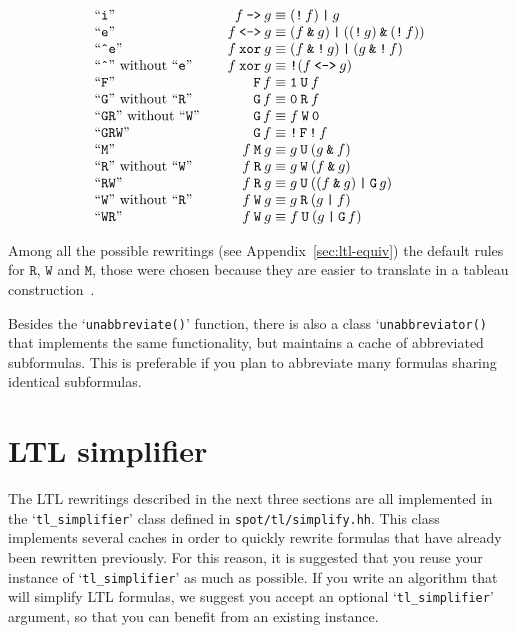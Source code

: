 \documentclass[a4paper,twoside,10pt,DIV=12]{scrreprt}
\DeclareMathOperator{\F}{\texttt{F}}
\DeclareMathOperator{\G}{\texttt{G}}
\newcommand{\U}{\mathbin{\texttt{U}}}
\newcommand{\R}{\mathbin{\texttt{R}}}
\newcommand{\M}{\mathbin{\texttt{M}}}
\newcommand{\W}{\mathbin{\texttt{W}}}
\DeclareMathOperator{\NOT}{\texttt{!}}
\newcommand{\XOR}{\mathbin{\texttt{xor}}}
\newcommand{\IMPLIES}{\mathbin{\texttt{->}}}
\newcommand{\EQUIV}{\mathbin{\texttt{<->}}}
\newcommand{\OR}{\mathbin{\texttt{|}}}
\newcommand{\AND}{\mathbin{\texttt{\&}}}
\newcommand{\0}{\texttt{0}}
\newcommand{\1}{\texttt{1}}
\begin{document}
\[
\begin{array}{l@{\qquad}r@{\;}c@{\;}l}
``\texttt{i}" & f\IMPLIES g &\equiv&  (\NOT f)\OR g\\
``\texttt{e}" & f\EQUIV g &\equiv&  (f\AND g)\OR ((\NOT g)\AND(\NOT f))\\
``\texttt{\^{}e}" & f\XOR g &\equiv&  (f\AND\NOT g)\OR (g\AND\NOT f)\\
``\texttt{\^{}}"\text{~without~}``\texttt{e}" & f\XOR g &\equiv&  \NOT(f\EQUIV g)\\
``\texttt{F}" & \F f&\equiv& \1\U f\\
``\texttt{G}"\text{~without~}``\texttt{R}" & \G f&\equiv& \0\R f \\
``\texttt{GR}"\text{~without~}``\texttt{W}" & \G f&\equiv& f \W \0 \\
``\texttt{GRW}" & \G f&\equiv& \NOT\F\NOT f \\
``\texttt{M}" & f \M g&\equiv& g \U (g \AND f) \\
``\texttt{R}"\text{~without~}``\texttt{W}" & f \R g&\equiv&  g\W (f \AND g)\\
``\texttt{RW}" & f \R g&\equiv&  g\U ((f \AND g) \OR \G g) \\
``\texttt{W}"\text{~without~}``\texttt{R}" & f \W g&\equiv& g \R (g \OR f)\\
``\texttt{WR}" & f \W g&\equiv& f \U (g \OR \G f)\\
\end{array}
\]

Among all the possible rewritings (see Appendix~\ref{sec:ltl-equiv})
the default rules for $\R$, $\W$ and $\M$, those were chosen because
they are easier to translate in a tableau
construction~\cite[Fig.~11]{duret.11.vecos}.

Besides the `\verb=unabbreviate()=' function, there is also a class
`\verb=unabbreviator()= that implements the same functionality, but
maintains a cache of abbreviated subformulas.  This is preferable if
you plan to abbreviate many formulas sharing identical subformulas.

\section{LTL simplifier}

The LTL rewritings described in the next three sections are all
implemented in the `\verb|tl_simplifier|' class defined in
\texttt{spot/tl/simplify.hh}.  This class implements several
caches in order to quickly rewrite formulas that have already been
rewritten previously.  For this reason, it is suggested that you reuse
your instance of `\verb|tl_simplifier|' as much as possible.  If you
write an algorithm that will simplify LTL formulas, we suggest you
accept an optional `\verb|tl_simplifier|' argument, so that you can
benefit from an existing instance.
\end{document}
